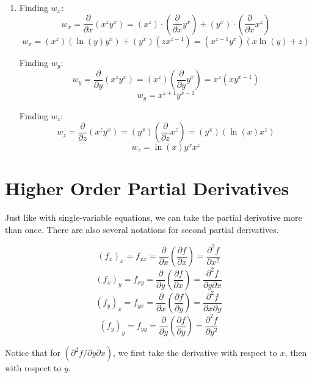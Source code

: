 \begin{Answer}[ref = three]
\begin{enumerate}
    \item Finding $w_x$:
    $$w_x = \frac{\partial}{\partial x} \left( x^z y^x \right) = \left( x^z 
    \right) \cdot \left( \frac{\partial}{\partial x} y^x \right) + \left( y^x 
    \right) \cdot \left( \frac{\partial}{\partial x} x^z \right)$$
    $$w_x = \left(x^z \right) \left( \ln{ \left( y \right)} y^x \right) + 
    \left( y^x \right) \left(zx^{z-1} \right) = \left(x^{z-1} y^x \right) 
    \left( x\ln{\left( y \right)} + z \right)$$

    Finding $w_y$:
    $$w_y = \frac{\partial}{\partial y} \left(x^z y^x \right) = \left( x^z 
    \right) \left( \frac{\partial}{\partial y} y^x \right) = x^z \left( xy^{
    x - 1} \right)$$
    $$w_y = x^{z + 1} y^{x - 1}$$

    Finding $w_z$:
    $$w_z = \frac{\partial}{\partial z} \left( x^z y^x \right) = \left( y^x 
    \right) \left( \frac{\partial}{\partial z} x^z \right) = \left( y^x \right)
    \left( \ln{\left(x \right)} x^z \right)$$
    $$w_z = \ln{ \left(x \right)} y^x x^z$$
\end{enumerate}
\end{Answer}

\section{Higher Order Partial Derivatives}
Just like with single-variable equations, we can take the partial derivative 
more than once. There are also several notations for second partial derivatives.

\begin{mdframed}[style = important, frametitle = 
{Second Partial Derivative Notation}]
$$(f_x)_x = f_{xx} = \frac{\partial}{\partial x} \left( \frac{\partial f}{
\partial x} \right) = \frac{\partial^2 f}{\partial x^2}$$
$$(f_x)_y = f_{xy} = \frac{\partial}{\partial y} \left( \frac{\partial f}{
\partial x} \right) = \frac{\partial^2 f}{\partial y \partial x}$$
$$(f_y)_x = f_{yx} = \frac{\partial}{\partial x} \left( \frac{\partial f}{
\partial y} \right) = \frac{\partial^2 f}{\partial x \partial y}$$
$$(f_y)_y = f_{yy} = \frac{\partial}{\partial y} \left( \frac{\partial f}{
\partial y} \right) = \frac{\partial^2 f}{\partial y^2}$$
\end{mdframed}

Notice that for $\left( \partial^2 f / \partial y \partial x \right)$, we 
first take the derivative with respect to $x$, then with respect to $y$. 

